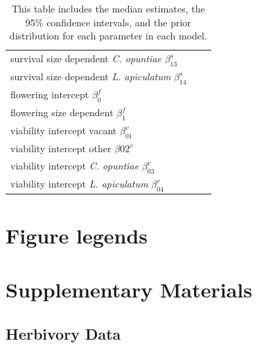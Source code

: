 \documentclass[11pt]{article}
\begin{document}
\begin{table}[]
\begin{tabular}{l|l|l}
		survival size dependent \textit{C. opuntiae} $\beta_{13}^s$ & & \\
		survival size dependent \textit{L. apiculatum} $\beta_{14}^s$ & & \\
		\hline
		flowering intercept $\beta_0^f$ & & \\
		flowering size dependent $\beta_1^f$ & & \\
		\hline
		viability intercept vacant $\beta_01^v$ & & \\
		viability intercept other $\beta02^v$ & & \\
		viability intercept \textit{C. opuntiae} $\beta_03^v$ & & \\
		viability intercept \textit{L. apiculatum} $\beta_04^v$ & & 
		
	\end{tabular}
	\caption{This table includes the median estimates, the 95$\%$ confidence intervals, and the prior distribution for each parameter in each model.}
	\label{tab:Params}
\end{table}

\section*{Figure legends}

\section*{Supplementary Materials}
\subsection*{Herbivory Data}
\end{document}
